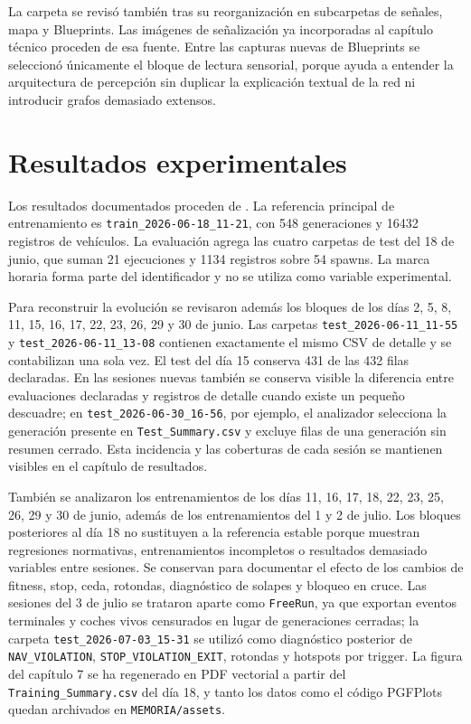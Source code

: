 La carpeta  se revisó también tras su reorganización en subcarpetas de señales, mapa y Blueprints. Las imágenes de señalización ya incorporadas al capítulo técnico proceden de esa fuente. Entre las capturas nuevas de Blueprints se seleccionó únicamente el bloque de lectura sensorial, porque ayuda a entender la arquitectura de percepción sin duplicar la explicación textual de la red ni introducir grafos demasiado extensos.

\section{Resultados experimentales}

Los resultados documentados proceden de . La referencia principal de entrenamiento es \texttt{train\_2026-06-18\_11-21}, con 548 generaciones y 16432 registros de vehículos. La evaluación agrega las cuatro carpetas de test del 18 de junio, que suman 21 ejecuciones y 1134 registros sobre 54 spawns. La marca horaria forma parte del identificador y no se utiliza como variable experimental.

Para reconstruir la evolución se revisaron además los bloques de los días 2, 5, 8, 11, 15, 16, 17, 22, 23, 26, 29 y 30 de junio. Las carpetas \texttt{test\_2026-06-11\_11-55} y \texttt{test\_2026-06-11\_13-08} contienen exactamente el mismo CSV de detalle y se contabilizan una sola vez. El test del día 15 conserva 431 de las 432 filas declaradas. En las sesiones nuevas también se conserva visible la diferencia entre evaluaciones declaradas y registros de detalle cuando existe un pequeño descuadre; en \texttt{test\_2026-06-30\_16-56}, por ejemplo, el analizador selecciona la generación presente en \texttt{Test\_Summary.csv} y excluye filas de una generación sin resumen cerrado. Esta incidencia y las coberturas de cada sesión se mantienen visibles en el capítulo de resultados.

También se analizaron los entrenamientos de los días 11, 16, 17, 18, 22, 23, 25, 26, 29 y 30 de junio, además de los entrenamientos del 1 y 2 de julio. Los bloques posteriores al día 18 no sustituyen a la referencia estable porque muestran regresiones normativas, entrenamientos incompletos o resultados demasiado variables entre sesiones. Se conservan para documentar el efecto de los cambios de fitness, stop, ceda, rotondas, diagnóstico de solapes y bloqueo en cruce. Las sesiones del 3 de julio se trataron aparte como \texttt{FreeRun}, ya que exportan eventos terminales y coches vivos censurados en lugar de generaciones cerradas; la carpeta \texttt{test\_2026-07-03\_15-31} se utilizó como diagnóstico posterior de \texttt{NAV\_VIOLATION}, \texttt{STOP\_VIOLATION\_EXIT}, rotondas y hotspots por trigger. La figura del capítulo 7 se ha regenerado en PDF vectorial a partir del \texttt{Training\_Summary.csv} del día 18, y tanto los datos como el código PGFPlots quedan archivados en \texttt{MEMORIA/assets}.

